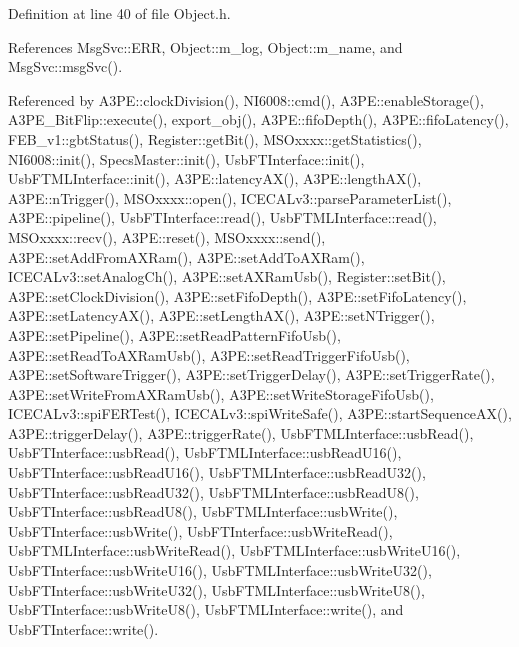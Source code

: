 Definition at line 40 of file Object.\+h.



References Msg\+Svc\+::\+E\+RR, Object\+::m\+\_\+log, Object\+::m\+\_\+name, and Msg\+Svc\+::msg\+Svc().



Referenced by A3\+P\+E\+::clock\+Division(), N\+I6008\+::cmd(), A3\+P\+E\+::enable\+Storage(), A3\+P\+E\+\_\+\+Bit\+Flip\+::execute(), export\+\_\+obj(), A3\+P\+E\+::fifo\+Depth(), A3\+P\+E\+::fifo\+Latency(), F\+E\+B\+\_\+v1\+::gbt\+Status(), Register\+::get\+Bit(), M\+S\+Oxxxx\+::get\+Statistics(), N\+I6008\+::init(), Specs\+Master\+::init(), Usb\+F\+T\+Interface\+::init(), Usb\+F\+T\+M\+L\+Interface\+::init(), A3\+P\+E\+::latency\+A\+X(), A3\+P\+E\+::length\+A\+X(), A3\+P\+E\+::n\+Trigger(), M\+S\+Oxxxx\+::open(), I\+C\+E\+C\+A\+Lv3\+::parse\+Parameter\+List(), A3\+P\+E\+::pipeline(), Usb\+F\+T\+Interface\+::read(), Usb\+F\+T\+M\+L\+Interface\+::read(), M\+S\+Oxxxx\+::recv(), A3\+P\+E\+::reset(), M\+S\+Oxxxx\+::send(), A3\+P\+E\+::set\+Add\+From\+A\+X\+Ram(), A3\+P\+E\+::set\+Add\+To\+A\+X\+Ram(), I\+C\+E\+C\+A\+Lv3\+::set\+Analog\+Ch(), A3\+P\+E\+::set\+A\+X\+Ram\+Usb(), Register\+::set\+Bit(), A3\+P\+E\+::set\+Clock\+Division(), A3\+P\+E\+::set\+Fifo\+Depth(), A3\+P\+E\+::set\+Fifo\+Latency(), A3\+P\+E\+::set\+Latency\+A\+X(), A3\+P\+E\+::set\+Length\+A\+X(), A3\+P\+E\+::set\+N\+Trigger(), A3\+P\+E\+::set\+Pipeline(), A3\+P\+E\+::set\+Read\+Pattern\+Fifo\+Usb(), A3\+P\+E\+::set\+Read\+To\+A\+X\+Ram\+Usb(), A3\+P\+E\+::set\+Read\+Trigger\+Fifo\+Usb(), A3\+P\+E\+::set\+Software\+Trigger(), A3\+P\+E\+::set\+Trigger\+Delay(), A3\+P\+E\+::set\+Trigger\+Rate(), A3\+P\+E\+::set\+Write\+From\+A\+X\+Ram\+Usb(), A3\+P\+E\+::set\+Write\+Storage\+Fifo\+Usb(), I\+C\+E\+C\+A\+Lv3\+::spi\+F\+E\+R\+Test(), I\+C\+E\+C\+A\+Lv3\+::spi\+Write\+Safe(), A3\+P\+E\+::start\+Sequence\+A\+X(), A3\+P\+E\+::trigger\+Delay(), A3\+P\+E\+::trigger\+Rate(), Usb\+F\+T\+M\+L\+Interface\+::usb\+Read(), Usb\+F\+T\+Interface\+::usb\+Read(), Usb\+F\+T\+M\+L\+Interface\+::usb\+Read\+U16(), Usb\+F\+T\+Interface\+::usb\+Read\+U16(), Usb\+F\+T\+M\+L\+Interface\+::usb\+Read\+U32(), Usb\+F\+T\+Interface\+::usb\+Read\+U32(), Usb\+F\+T\+M\+L\+Interface\+::usb\+Read\+U8(), Usb\+F\+T\+Interface\+::usb\+Read\+U8(), Usb\+F\+T\+M\+L\+Interface\+::usb\+Write(), Usb\+F\+T\+Interface\+::usb\+Write(), Usb\+F\+T\+Interface\+::usb\+Write\+Read(), Usb\+F\+T\+M\+L\+Interface\+::usb\+Write\+Read(), Usb\+F\+T\+M\+L\+Interface\+::usb\+Write\+U16(), Usb\+F\+T\+Interface\+::usb\+Write\+U16(), Usb\+F\+T\+M\+L\+Interface\+::usb\+Write\+U32(), Usb\+F\+T\+Interface\+::usb\+Write\+U32(), Usb\+F\+T\+M\+L\+Interface\+::usb\+Write\+U8(), Usb\+F\+T\+Interface\+::usb\+Write\+U8(), Usb\+F\+T\+M\+L\+Interface\+::write(), and Usb\+F\+T\+Interface\+::write().


